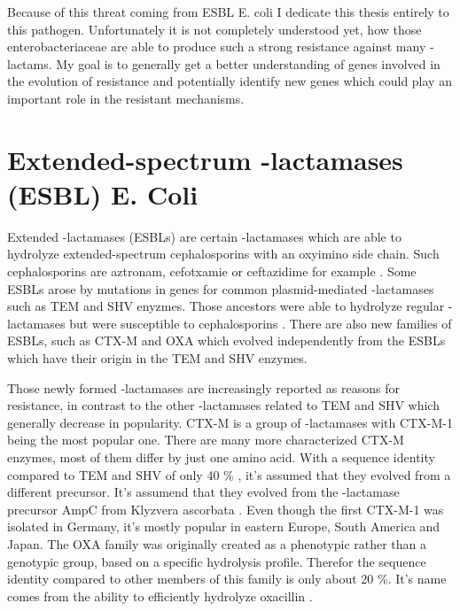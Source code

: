 Because of this threat coming from ESBL E. coli I dedicate this thesis entirely to this pathogen. Unfortunately it is not completely understood yet, how those enterobacteriaceae are able to produce such a strong resistance against many \textbeta-lactams. My goal is to generally get a better understanding of genes involved in the evolution of resistance and potentially identify new genes which could play an important role in the resistant mechanisms. 

\section{Extended-spectrum -lactamases (ESBL) E. Coli}
Extended \textbeta-lactamases (ESBLs) are certain \textbeta-lactamases which are able to hydrolyze extended-spectrum cephalosporins with an oxyimino side chain. Such cephalosporins are aztronam, cefotxamie or ceftazidime for example \cite{esbl_introduction}. 
Some ESBLs arose by mutations in genes for common plasmid-mediated \textbeta-lactamases such as TEM and SHV enyzmes. Those ancestors were able to hydrolyze regular \textbeta-lactamases but were susceptible to cephalosporins \cite{esbl_introduction_emerg}. 
There are also new families of ESBLs, such as CTX-M and OXA \cite{ctx-m} which evolved independently from the ESBLs which have their origin in the TEM and SHV enzymes. 

Those newly formed \textbeta-lactamases are increasingly reported as reasons for resistance, in contrast to the other \textbeta-lactamases related to TEM and SHV which generally decrease in popularity.
CTX-M is a group of \textbeta-lactamases with CTX-M-1 being the most popular one. There are many more characterized CTX-M enzymes, most of them differ by just one amino acid. With a sequence identity compared to TEM and SHV of only 40 \% \cite{ctx-m}, it's assumed that they evolved from a different precursor. It's assumend that they evolved from the \textbeta-lactamase precursor AmpC from Klyzvera ascorbata  \cite{ctx-m}. Even though the first CTX-M-1 was isolated in Germany, it's mostly popular in eastern Europe, South America and Japan.
The OXA family was originally created as a phenotypic rather than a genotypic group, based on a specific hydrolysis profile. Therefor the sequence identity compared to other members of this family is only about 20 \%. It's name comes from the ability to efficiently hydrolyze oxacillin \cite{ctx-m}.
   
